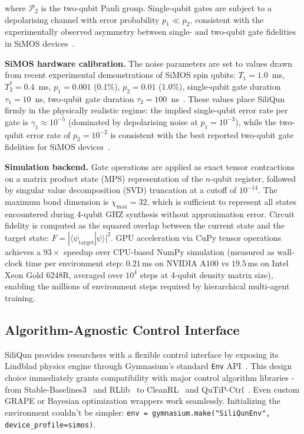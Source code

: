 where $\mathcal{P}_2$ is the two-qubit Pauli group. Single-qubit gates are subject to a depolarising channel with error probability $p_1 \ll p_2$, consistent with the experimentally observed asymmetry between single- and two-qubit gate fidelities in SiMOS devices~\cite{Xue2022,Noiri2022}.

\textbf{SiMOS hardware calibration.} The noise parameters are set to values drawn from recent experimental demonstrations of SiMOS spin qubits: $T_1 = 1.0$~ms, $T_2^* = 0.4$~ms, $p_1 = 0.001$ (0.1\%), $p_2 = 0.01$ (1.0\%), single-qubit gate duration $\tau_1 = 10$~ns, two-qubit gate duration $\tau_2 = 100$~ns~\cite{Xue2022,Noiri2022,Philips2022}. These values place SiliQun firmly in the physically realistic regime: the implied single-qubit error rate per gate is $\gamma_1 \approx 10^{-5}$ (dominated by depolarising noise at $p_1 = 10^{-3}$), while the two-qubit error rate of $p_2 = 10^{-2}$ is consistent with the best reported two-qubit gate fidelities for SiMOS devices~\cite{Noiri2022,Philips2022}.

\textbf{Simulation backend.} Gate operations are applied as exact tensor contractions on a matrix product state (MPS) representation of the $n$-qubit register, followed by singular value decomposition (SVD) truncation at a cutoff of $10^{-14}$. The maximum bond dimension is $\chi_\text{max} = 32$, which is sufficient to represent all states encountered during 4-qubit GHZ synthesis without approximation error. Circuit fidelity is computed as the squared overlap between the current state and the target state: $F = |\langle \psi_\text{target} | \psi \rangle|^2$. GPU acceleration via CuPy tensor operations achieves a $93\times$ speedup over CPU-based NumPy simulation (measured as wall-clock time per environment step: $0.21$\,ms on NVIDIA A100 vs $19.5$\,ms on Intel Xeon Gold 6248R, averaged over $10^4$ steps at 4-qubit density matrix size)\label{subsec:gpu_benchmark}, enabling the millions of environment steps required by hierarchical multi-agent training.

\subsection{Algorithm-Agnostic Control Interface}
\label{subsec:gymnasium}
SiliQun provides researchers with a flexible control interface by exposing its Lindblad physics engine through Gymnasium's standard \texttt{Env} API~\cite{Towers2023}. This design choice immediately grants compatibility with major control algorithm libraries - from Stable-Baselines3~\cite{Raffin2021} and RLlib~\cite{Liang2018} to CleanRL~\cite{Huang2022} and QuTiP-Ctrl~\cite{QuTiPCtrl2023}. Even custom GRAPE or Bayesian optimization wrappers work seamlessly. Initializing the environment couldn't be simpler: \texttt{env = gymnasium.make("SiliQunEnv", device\_profile=simos)}. 

